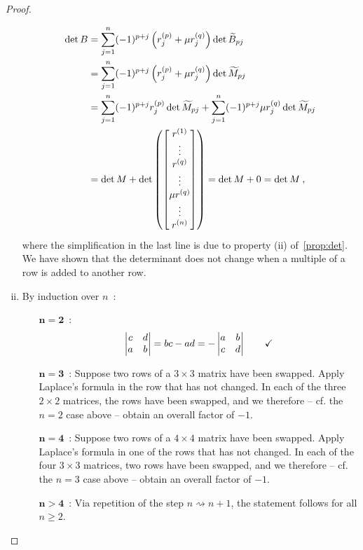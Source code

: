 \begin{proof}
\begin{enumerate}[(i)]
	\begin{equation*}
	\begin{split}
	\det B & = \sum_{j=1}^n (-1)^{p+j} \left( r_j^{(p)} + \mu r_j^{(q)} \right) \det \widetilde{B}_{pj} \\
	& = \sum_{j=1}^n (-1)^{p+j} \left( r_j^{(p)} + \mu r_j^{(q)} \right) \det \widetilde{M}_{pj} \\
	& = \sum_{j=1}^n (-1)^{p+j} r_j^{(p)} \det \widetilde{M}_{pj} + \sum_{j=1}^n (-1)^{p+j} \mu r_j^{(q)} \det \widetilde{M}_{pj} \\
	& = \det M + \det \left( \begin{bmatrix}
	r^{(1)} \\ \vdots \\ r^{(q)} \\ \vdots \\ \mu r^{(q)} \\ \vdots \\ r^{(n)}
	\end{bmatrix}\right) = \det M + 0 = \det M \:,
	\end{split}
	\end{equation*}
	where the simplification in the last line is due to property (ii) of~\ref{prop:det}. We have shown that the determinant does not change when a multiple of a row is added to another row.
	\item By induction over $n$~:
	\begin{itemize}
		\item[$\mathbf{n=2}$~:]
		\[ \begin{vmatrix}
		c & d \\ a & b
		\end{vmatrix} = bc-ad = - \begin{vmatrix}
		a & b \\ c & d
		\end{vmatrix} \qquad \text{\checkmark} \]
		\item[$\mathbf{n=3}$~:] Suppose two rows of a $3 \times 3$ matrix have been swapped. Apply Laplace's formula in the row that has not changed. In each of the three $2 \times 2$ matrices, the rows have been swapped, and we therefore -- cf. the $n=2$ case above -- obtain an overall factor of $-1$.
		\item[$\mathbf{n=4}$~:] Suppose two rows of a $4 \times 4$ matrix have been swapped. Apply Laplace's formula in one of the rows that has not changed. In each of the four $3 \times 3$ matrices, two rows have been swapped, and we therefore -- cf. the $n=3$ case above -- obtain an overall factor of $-1$.
  		\item[$\mathbf{n>4}$~:] Via repetition of the step $n \rightsquigarrow n + 1$, the statement follows for all $n\geq2$.

\end{itemize}
\end{enumerate}
\end{proof}
